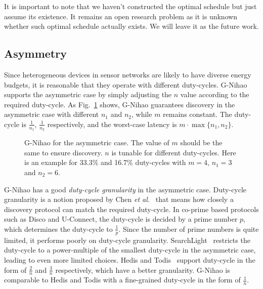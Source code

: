 \documentclass[conference]{IEEEtran}
\begin{document}
It is important to note that we haven't constructed the optimal schedule but just assume its existence.
It remains an open research problem as it is unknown whether such optimal schedule actually exists.
We will leave it as the future work.

\subsection{Asymmetry}
Since heterogeneous devices in sensor networks are likely to have diverse energy budgets,
it is reasonable that they operate with different duty-cycles.
G-Nihao supports the asymmetric case by simply adjusting the $n$ value according to the required duty-cycle.
As Fig.~\ref{asymmetricnihao} shows, G-Nihao guarantees discovery in the asymmetric case with different $n_1$ and $n_2$, while $m$ remains constant.
The duty-cycle is $\frac{1}{n_1}$, $\frac{1}{n_2}$ respectively,
and the worst-case latency is $m \cdot \max\{n_1,n_2\}$.

\begin{figure}[t]
    \centering

    \caption{G-Nihao for the asymmetric case.
        The value of $m$ should be the same to ensure discovery.
        $n$ is tunable for different duty-cycles.
        Here is an example for 33.3\% and 16.7\% duty-cycles with $m=4$, $n_1=3$ and $n_2=6$.}\label{asymmetricnihao}
\end{figure}

G-Nihao has a good \emph{duty-cycle granularity} in the asymmetric case.
Duty-cycle granularity is a notion proposed by Chen \emph{et al.}~\cite{chen2015infocom} that means how closely a discovery protocol can match the required duty-cycle.
In co-prime based protocols such as Disco and U-Connect, the duty-cycle is decided by a prime number $p$, which determines the duty-cycle to $\frac{1}{p}$.
Since the number of prime numbers is quite limited, it performs poorly on duty-cycle granularity.
SearchLight~\cite{bakht2012mobicom} restricts the duty-cycle to a power-multiple of the smallest duty-cycle in the asymmetric case, leading to even more limited choices.
Hedis and Todis~\cite{chen2015infocom} support duty-cycle in the form of $\frac{2}{n}$ and $\frac{3}{n}$ respectively, which have a better granularity.
G-Nihao is comparable to Hedis and Todis with a fine-grained duty-cycle in the form of $\frac{1}{n}$.
\end{document}
